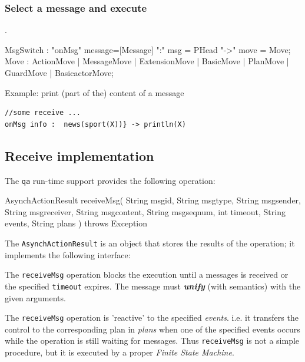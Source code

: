 \subsubsection{Select a message and execute}.
 
\begin{javacode}  
MsgSwitch : "onMsg" message=[Message]   ":" msg = PHead "->" move = Move;
Move      : ActionMove | MessageMove | ExtensionMove  | BasicMove | PlanMove | GuardMove | BasicactorMove;
\end{javacode}

\noindent Example: print (part of the) content of a message 
\begin{Verbatim}[fontsize=\scriptsize, frame=single]
//some receive ...
onMsg info :  news(sport(X))} -> println(X)
\end{Verbatim}
 

\subsection{Receive implementation}  
The \texttt{qa} run-time support provides the following operation:
\begin{javacode}
AsynchActionResult receiveMsg( String msgid, String msgtype, String msgsender, String msgreceiver, 
			String msgcontent, String msgseqnum, int timeout, String events, String plans ) throws Exception
\end{javacode}

The \texttt{AsynchActionResult} is an object that stores the results of the operation; it implements the following interface:
 
  

The \texttt{receiveMsg} operation blocks the execution until a messages is received or the specified \texttt{timeout} expires. The message must \textbf{\textit{unify}} (with \prolog{} semantics) with the given arguments.
 
The \texttt{receiveMsg}  operation is 'reactive' to the specified \textit{events}. i.e. it transfers the control to the corresponding plan in \textit{plans} when one of the specified events occurs while the operation is still waiting for messages. Thus  \texttt{receiveMsg} is not a simple procedure, but it is executed by a proper \textit{Finite State Machine}.
 
